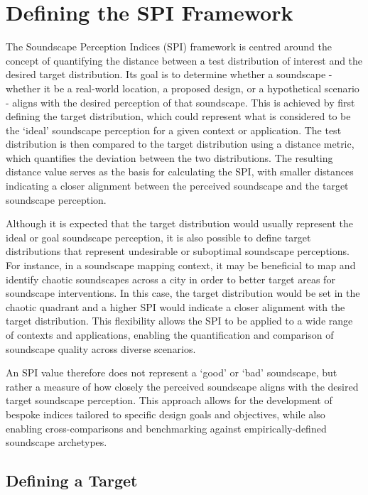 \documentclass[
  authoryear,
  preprint,
  3p]{elsarticle}
\begin{document}
\section{Defining the SPI Framework}\label{defining-the-spi-framework}

The Soundscape Perception Indices (SPI) framework is centred around the
concept of quantifying the distance between a test distribution of
interest and the desired target distribution. Its goal is to determine
whether a soundscape - whether it be a real-world location, a proposed
design, or a hypothetical scenario - aligns with the desired perception
of that soundscape. This is achieved by first defining the target
distribution, which could represent what is considered to be the `ideal'
soundscape perception for a given context or application. The test
distribution is then compared to the target distribution using a
distance metric, which quantifies the deviation between the two
distributions. The resulting distance value serves as the basis for
calculating the SPI, with smaller distances indicating a closer
alignment between the perceived soundscape and the target soundscape
perception.

Although it is expected that the target distribution would usually
represent the ideal or goal soundscape perception, it is also possible
to define target distributions that represent undesirable or suboptimal
soundscape perceptions. For instance, in a soundscape mapping context,
it may be beneficial to map and identify chaotic soundscapes across a
city in order to better target areas for soundscape interventions. In
this case, the target distribution would be set in the chaotic quadrant
and a higher SPI would indicate a closer alignment with the target
distribution. This flexibility allows the SPI to be applied to a wide
range of contexts and applications, enabling the quantification and
comparison of soundscape quality across diverse scenarios.

An SPI value therefore does not represent a `good' or `bad' soundscape,
but rather a measure of how closely the perceived soundscape aligns with
the desired target soundscape perception. This approach allows for the
development of bespoke indices tailored to specific design goals and
objectives, while also enabling cross-comparisons and benchmarking
against empirically-defined soundscape archetypes.

\subsection{Defining a Target}\label{defining-a-target}
\end{document}
